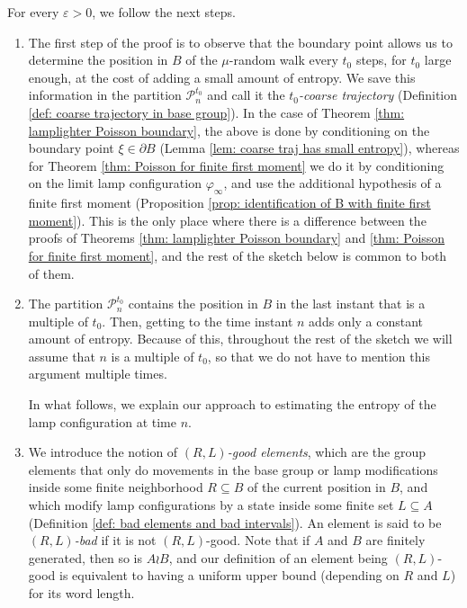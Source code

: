 \documentclass[reqno,oneside,11pt]{amsart}
\theoremstyle{plain}
\theoremstyle{definition}
\begin{document}
For every $\varepsilon>0$, we follow the next steps.
\begin{enumerate}
	\item\label{step: step 1} The first step of the proof is to observe that the boundary point allows us to determine the position in $B$ of the $\mu$-random walk every $t_0$ steps, for $t_0$ large enough, at the cost of adding a small amount of entropy. We save this information in the partition $\mathcal{P}_n^{t_0}$ and call it the \emph{$t_0$-coarse trajectory} (Definition \ref{def: coarse trajectory in base group}). In the case of Theorem \ref{thm: lamplighter Poisson boundary}, the above is done by conditioning on the boundary point $\xi \in \partial B$ (Lemma \ref{lem: coarse traj has small entropy}), whereas for Theorem \ref{thm: Poisson for finite first moment} we do it by conditioning on the limit lamp configuration $\varphi_{\infty}$, and use the additional hypothesis of a finite first moment (Proposition \ref{prop: identification of B with finite first moment}). This is the only place where there is a difference between the proofs of Theorems \ref{thm: lamplighter Poisson boundary} and \ref{thm: Poisson for finite first moment}, and the rest of the sketch below is common to both of them.
	
	\item \label{step: step 2} The partition $\mathcal{P}_n^{t_0}$ contains the position in $B$ in the last instant that is a multiple of $t_0$. Then, getting to the time instant $n$ adds only a constant amount of entropy. Because of this, throughout the rest of the sketch we will assume that $n$ is a multiple of $t_0$, so that we do not have to mention this argument multiple times. 
	
	In what follows, we explain our approach to estimating the entropy of the lamp configuration at time $n$. 
	
	\item \label{step: step 3} We introduce the notion of \emph{$(R,L)$-good elements}, which are the group elements that only do movements in the base group or lamp modifications inside some finite neighborhood $R\subseteq B$ of the current position in $B$, and which modify lamp configurations by a state inside some finite set $L\subseteq A$ (Definition \ref{def: bad elements and bad intervals}). An element is said to be \emph{$(R,L)$-bad} if it is not $(R,L)$-good. Note that if $A$ and $B$ are finitely generated, then so is $A\wr B$, and our definition of an element being $(R,L)$-good is equivalent to having a uniform upper bound (depending on $R$ and $L$) for its word length. 
	

\end{enumerate}
\end{document}
